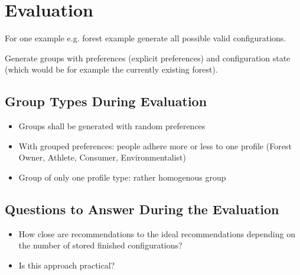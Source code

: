 \documentclass{article}
\begin{document}
    
\section{Evaluation}

For one example e.g. forest example generate all possible valid configurations.

Generate groups with preferences (explicit preferences) and configuration state (which would be for example the currently existing forest).

\subsection{Group Types During Evaluation}
\begin{itemize}
    \item Groups shall be generated with random preferences
    \item With grouped preferences: people adhere more or less to one profile (Forest Owner, Athlete, Consumer, Environmentalist)
    \item Group of only one profile type: rather homogenous group
\end{itemize}

\subsection{Questions to Answer During the Evaluation}

\begin{itemize}
    \item How close are recommendations to the ideal recommendations depending on the number of stored finished configurations?
    \item Is this approach practical?
\end{itemize}
\end{document}
